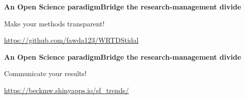\documentclass[serif]{beamer}\usepackage[]{graphicx}\usepackage[]{color}
\begin{document}
\begin{frame}{\textbf{An Open Science paradigm}}{\textbf{Bridge the research-management divide}}
\centerline{Make your methods transparent!}
\centerline{{\small \url{https://github.com/fawda123/WRTDStidal}}}
\begin{center}
\end{center}
\end{frame}

\begin{frame}{\textbf{An Open Science paradigm}}{\textbf{Bridge the research-management divide}}
\centerline{Communicate your results!}
\centerline{{\small \url{https://beckmw.shinyapps.io/sf_trends/}}}
\begin{center}
\end{center}
\end{frame}
\end{document}
